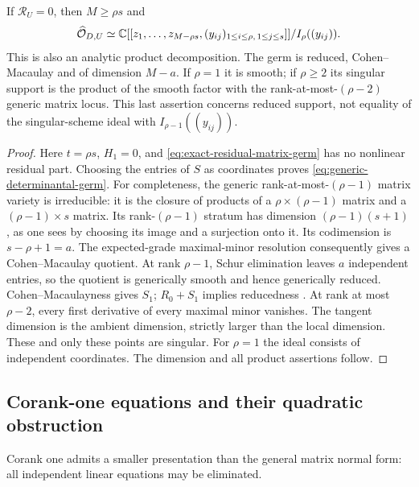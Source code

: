 \begin{corollary}
\label{cor:transverse-determinantal-germ}
If $\mathcal R_U=0$, then $M\ge\rho s$ and
\begin{equation}\label{eq:generic-determinantal-germ}
 \widehat{\mathcal O}_{D,U}\simeq
 \mathbb C[[z_1,\ldots,z_{M-\rho s},(y_{ij})_{1\le i\le\rho,\,1\le j\le s}]]
                         /I_\rho((y_{ij})).
\end{equation}
This is also an analytic product decomposition. The germ is reduced,
Cohen--Macaulay and of dimension $M-a$. If $\rho=1$ it is smooth;
if $\rho\ge2$ its singular support is the product of the smooth
factor with the rank-at-most-$(\rho-2)$ generic matrix locus.
This last assertion concerns reduced support, not equality of the
singular-scheme ideal with $I_{\rho-1}((y_{ij}))$.
\end{corollary}
\begin{proof}
Here $t=\rho s$, $H_1=0$, and \eqref{eq:exact-residual-matrix-germ}
has no nonlinear residual part. Choosing the entries of $S$ as
coordinates proves \eqref{eq:generic-determinantal-germ}.
For completeness, the generic rank-at-most-$(\rho-1)$ matrix variety
is irreducible: it is the closure of products of a
$\rho\times(\rho-1)$ matrix and a $(\rho-1)\times s$ matrix.
Its rank-$(\rho-1)$ stratum has dimension
$(\rho-1)(s+1)$, as one sees by choosing its image and a surjection
onto it. Its codimension is $s-\rho+1=a$. The expected-grade
maximal-minor resolution \cite{EN} consequently gives a
Cohen--Macaulay quotient. At rank $\rho-1$, Schur elimination leaves
$a$ independent entries, so the quotient is generically smooth and
hence generically reduced. Cohen--Macaulayness gives $S_1$;
$R_0+S_1$ implies reducedness \cite{Stacks}.
At rank at most $\rho-2$, every first derivative of every maximal
minor vanishes. The tangent dimension is the ambient dimension,
strictly larger than the local dimension. These and only these
points are singular. For $\rho=1$ the ideal consists of independent
coordinates. The dimension and all product assertions follow.
\end{proof}

\subsection{Corank-one equations and their quadratic obstruction}
Corank one admits a smaller presentation than the general matrix
normal form: all independent linear equations may be eliminated.

